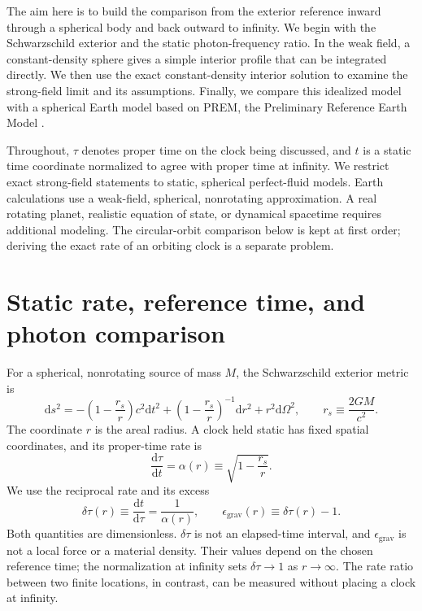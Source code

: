 \documentclass[12pt]{article}
\begin{document}
The aim here is to build the comparison from the exterior reference inward through a spherical body and back outward to infinity. We begin with the Schwarzschild exterior and the static photon-frequency ratio. In the weak field, a constant-density sphere gives a simple interior profile that can be integrated directly. We then use the exact constant-density interior solution to examine the strong-field limit and its assumptions. Finally, we compare this idealized model with a spherical Earth model based on PREM, the Preliminary Reference Earth Model \cite{PREM}.

Throughout, $\tau$ denotes proper time on the clock being discussed, and $t$ is a static time coordinate normalized to agree with proper time at infinity. We restrict exact strong-field statements to static, spherical perfect-fluid models. Earth calculations use a weak-field, spherical, nonrotating approximation. A real rotating planet, realistic equation of state, or dynamical spacetime requires additional modeling. The circular-orbit comparison below is kept at first order; deriving the exact rate of an orbiting clock is a separate problem.

\section{Static rate, reference time, and photon comparison}

For a spherical, nonrotating source of mass $M$, the Schwarzschild exterior metric is \cite{SchwarzschildExterior}
\begin{equation}
  \mathrm{d}s^2
  =-\left(1-\frac{r_s}{r}\right)c^2\mathrm{d}t^2
   +\left(1-\frac{r_s}{r}\right)^{-1}\mathrm{d}r^2
   +r^2\mathrm{d}\Omega^2,
  \qquad
  r_s\equiv\frac{2GM}{c^2}.
  \label{eq:exterior-metric}
\end{equation}
The coordinate $r$ is the areal radius. A clock held static has fixed spatial coordinates, and its proper-time rate is
\begin{equation}
  \frac{\mathrm{d}\tau}{\mathrm{d}t}
  =\alpha(r)\equiv\sqrt{1-\frac{r_s}{r}}.
  \label{eq:exterior-lapse}
\end{equation}
We use the reciprocal rate and its excess
\begin{equation}
  \delta\tau(r)\equiv\frac{\mathrm{d}t}{\mathrm{d}\tau}
  =\frac{1}{\alpha(r)},
  \qquad
  \epsilon_{\mathrm{grav}}(r)\equiv\delta\tau(r)-1.
  \label{eq:inverse-rate}
\end{equation}
Both quantities are dimensionless. $\delta\tau$ is not an elapsed-time interval, and $\epsilon_{\mathrm{grav}}$ is not a local force or a material density. Their values depend on the chosen reference time; the normalization at infinity sets $\delta\tau\to1$ as $r\to\infty$. The rate ratio between two finite locations, in contrast, can be measured without placing a clock at infinity.
\end{document}
